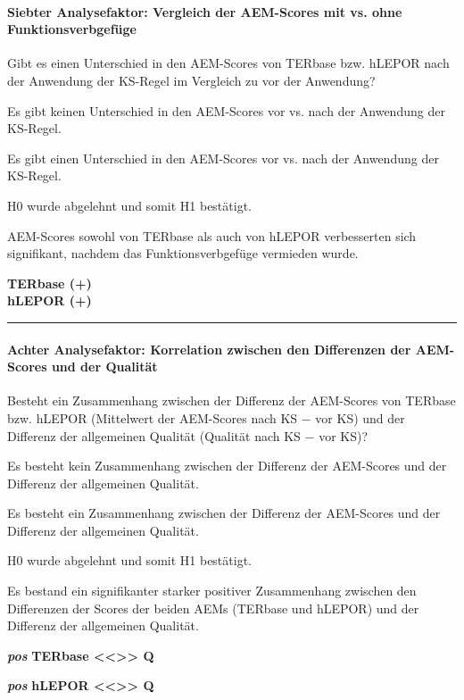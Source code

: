 \paragraph*{Siebter Analysefaktor: Vergleich der AEM-Scores mit vs. ohne Funktionsverbgefüge}
\begin{description}[font=\normalfont\bfseries]
\item [Fragestellung:] Gibt es einen Unterschied in den AEM-Scores von TERbase bzw. hLEPOR nach der Anwendung der KS-Regel im Vergleich zu vor der Anwendung?
\item [H0 --] Es gibt keinen Unterschied in den AEM-Scores vor vs. nach der Anwendung der KS-Regel.
\item [H1 --] Es gibt einen Unterschied in den AEM-Scores vor vs. nach der Anwendung der KS-Regel.
\item [Resultat]
\end{description}
\noindent
\parbox[t]{.75\textwidth}{H0 wurde abgelehnt und somit H1 bestätigt.

AEM-Scores sowohl von TERbase als auch von hLEPOR verbesserten sich signifikant, nachdem das Funktionsverbgefüge vermieden wurde.}
\parbox[t]{.04\textwidth}{}
\colorbox{smGreen}{\parbox[t]{.2\textwidth}{\textbf{TERbase (+)\\hLEPOR (+)}\vspace{22pt}}}
\hrule
\paragraph*{Achter Analysefaktor: Korrelation zwischen den Differenzen der AEM-Scores und der Qualität}
\begin{description}[font=\normalfont\bfseries]
\item [Fragestellung:] Besteht ein Zusammenhang zwischen der Differenz der AEM-Scores von TERbase bzw. hLEPOR (Mittelwert der AEM-Scores nach KS $-$ vor KS) und der Differenz der allgemeinen Qualität (Qualität nach KS $-$ vor KS)?
\item [H0 --] Es besteht kein Zusammenhang zwischen der Differenz der AEM-Scores und der Differenz der allgemeinen Qualität.
\item [H1 --] Es besteht ein Zusammenhang zwischen der Differenz der AEM-Scores und der Differenz der allgemeinen Qualität.
\newpage
\item [Resultat]
\end{description}
\noindent
\parbox[t]{.7\textwidth}{H0 wurde abgelehnt und somit H1 bestätigt.

Es bestand ein signifikanter starker positiver Zusammenhang zwischen den Differenzen der Scores der beiden AEMs (TERbase und hLEPOR) und der Differenz der allgemeinen Qualität.}
\parbox[t]{.04\textwidth}{}
\colorbox{smGreen}{\parbox[t]{.25\textwidth}{\textbf{\textit{pos}} \textbf{TERbase <{}<{}>{}> Q}

 \textbf{\textit{pos}} \textbf{hLEPOR <{}<{}>{}> Q}\vspace{40pt}}}


